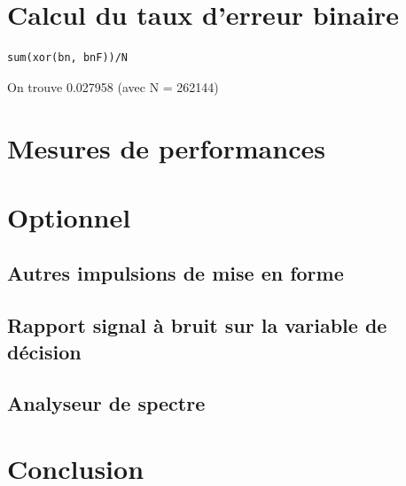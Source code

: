 \documentclass{acm_proc_article-sp}
\begin{document}
\section{Calcul du taux d'erreur binaire}

\begin{lstlisting}
sum(xor(bn, bnF))/N
\end{lstlisting}

On trouve 0.027958 (avec N = 262144)

\section{Mesures de performances}


\section{Optionnel}
\subsection{Autres impulsions de mise en forme}
\subsection{Rapport signal à bruit sur la variable de décision}
\subsection{Analyseur de spectre}


\section{Conclusion}


\nocite{*}

\balancecolumns
\end{document}

